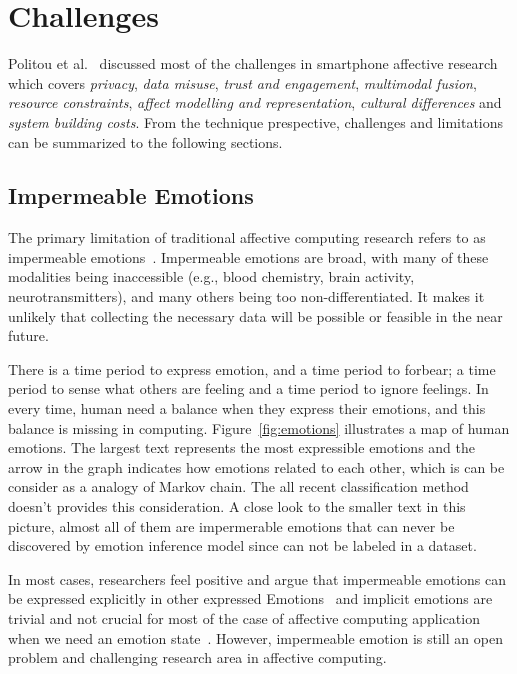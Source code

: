 \section{Challenges}\label{sec:challenges}

Politou et al.~\cite{Politou2017} discussed most of the challenges in smartphone affective research which covers \emph{privacy}, \emph{data misuse}, \emph{trust and engagement}, \emph{multimodal fusion}, \emph{resource constraints}, \emph{affect modelling and representation}, \emph{cultural differences} and \emph{system building costs}. From the technique prespective, challenges and limitations can be summarized to the following sections.

\subsection{Impermeable Emotions}

The primary limitation of traditional affective computing research refers to as impermeable emotions~\cite{picard2003affective}. Impermeable emotions are broad, with many of these modalities being inaccessible (e.g., blood chemistry, brain activity, neurotransmitters), and many others being too non-differentiated. It makes it unlikely that collecting the necessary data will be possible or feasible in the near future. 

There is a time period to express emotion, and a time period to forbear; a time period to sense what others are feeling and a time period to ignore feelings. In every time, human need a balance when they express their emotions, and this balance is missing in computing. Figure~\ref{fig:emotions} illustrates a map of human emotions. The largest text represents the most expressible emotions and the arrow in the graph indicates how emotions related to each other, which is can be consider as a analogy of Markov chain.
The all recent classification method doesn't provides this consideration. A close look to the smaller text in this picture, almost all of them are impermerable emotions that can never be discovered by emotion inference model since can not be labeled in a dataset.

In most cases, researchers feel positive and argue that impermeable emotions can be expressed explicitly in other expressed Emotions~\cite{parkinson1995ideas} and implicit emotions are trivial and not crucial for most of the case of affective computing application when we need an emotion state~\cite{Zhang2014}. However, impermeable emotion is still an open problem and challenging research area in affective computing.

